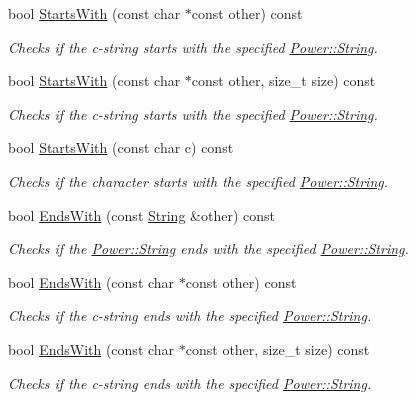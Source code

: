 \begin{DoxyCompactItemize}
bool \hyperlink{class_power_1_1_string_a97d52a90799b590cfed6f3ce9d2204fc}{Starts\+With} (const char $\ast$const other) const
\begin{DoxyCompactList}\small\item\em Checks if the c-\/string starts with the specified \hyperlink{class_power_1_1_string}{Power\+::\+String}. \end{DoxyCompactList}\item 
bool \hyperlink{class_power_1_1_string_a44421001e181eeba0531f76f933abe4e}{Starts\+With} (const char $\ast$const other, size\+\_\+t size) const
\begin{DoxyCompactList}\small\item\em Checks if the c-\/string starts with the specified \hyperlink{class_power_1_1_string}{Power\+::\+String}. \end{DoxyCompactList}\item 
bool \hyperlink{class_power_1_1_string_a7c32b540950bc8b7061751333ec8ef17}{Starts\+With} (const char c) const
\begin{DoxyCompactList}\small\item\em Checks if the character starts with the specified \hyperlink{class_power_1_1_string}{Power\+::\+String}. \end{DoxyCompactList}\item 
bool \hyperlink{class_power_1_1_string_ae936d98f4be00ce5b901a561cac63ab0}{Ends\+With} (const \hyperlink{class_power_1_1_string}{String} \&other) const
\begin{DoxyCompactList}\small\item\em Checks if the \hyperlink{class_power_1_1_string}{Power\+::\+String} ends with the specified \hyperlink{class_power_1_1_string}{Power\+::\+String}. \end{DoxyCompactList}\item 
bool \hyperlink{class_power_1_1_string_a007514d96b8e99416e0c10f6b72675c5}{Ends\+With} (const char $\ast$const other) const
\begin{DoxyCompactList}\small\item\em Checks if the c-\/string ends with the specified \hyperlink{class_power_1_1_string}{Power\+::\+String}. \end{DoxyCompactList}\item 
bool \hyperlink{class_power_1_1_string_ad265a1ae695573549f1c2046a342ca27}{Ends\+With} (const char $\ast$const other, size\+\_\+t size) const
\begin{DoxyCompactList}\small\item\em Checks if the c-\/string ends with the specified \hyperlink{class_power_1_1_string}{Power\+::\+String}. \end{DoxyCompactList}\item 

\end{DoxyCompactItemize}
